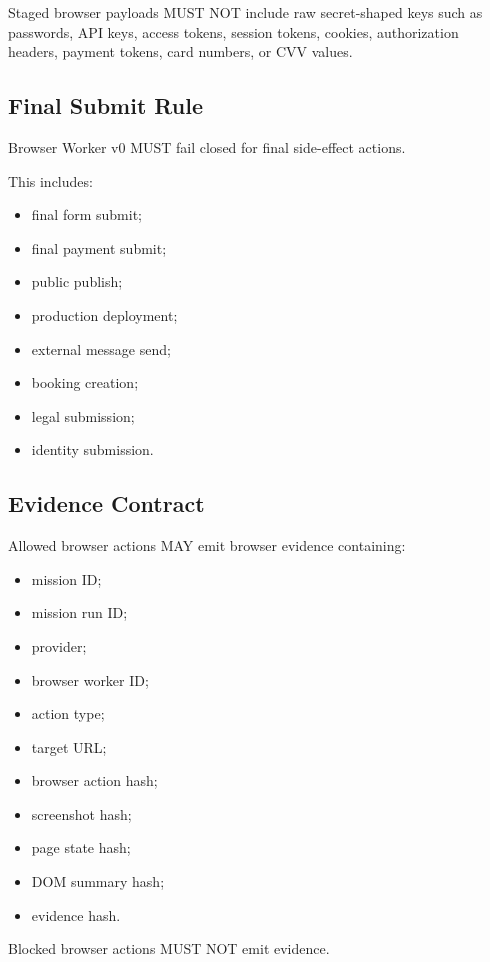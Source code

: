 Staged browser payloads MUST NOT include raw secret-shaped keys such as passwords, API keys, access tokens, session tokens, cookies, authorization headers, payment tokens, card numbers, or CVV values.

\subsection{Final Submit Rule}

Browser Worker v0 MUST fail closed for final side-effect actions.

This includes:

\begin{itemize}
  \item final form submit;
  \item final payment submit;
  \item public publish;
  \item production deployment;
  \item external message send;
  \item booking creation;
  \item legal submission;
  \item identity submission.
\end{itemize}

\subsection{Evidence Contract}

Allowed browser actions MAY emit browser evidence containing:

\begin{itemize}
  \item mission ID;
  \item mission run ID;
  \item provider;
  \item browser worker ID;
  \item action type;
  \item target URL;
  \item browser action hash;
  \item screenshot hash;
  \item page state hash;
  \item DOM summary hash;
  \item evidence hash.
\end{itemize}

Blocked browser actions MUST NOT emit evidence.

